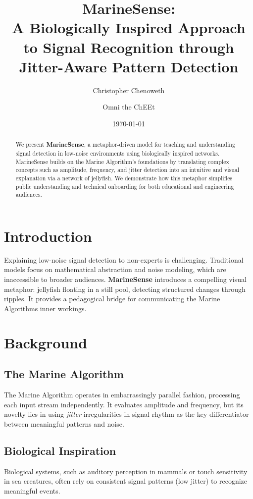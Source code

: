 \documentclass[11pt]{article}
\title{MarineSense:\\A Biologically Inspired Approach to Signal Recognition through Jitter-Aware Pattern Detection}
\author{Christopher Chenoweth \and Omni the ChEEt}
\date{\today}
\begin{document}
\maketitle

\begin{abstract}
We present \textbf{MarineSense}, a metaphor-driven model for teaching and understanding signal detection in low-noise environments using biologically inspired networks. MarineSense builds on the Marine Algorithm's foundations by translating complex concepts such as amplitude, frequency, and jitter detection into an intuitive and visual explanation via a network of jellyfish. We demonstrate how this metaphor simplifies public understanding and technical onboarding for both educational and engineering audiences.
\end{abstract}

\section{Introduction}
Explaining low-noise signal detection to non-experts is challenging. Traditional models focus on mathematical abstraction and noise modeling, which are inaccessible to broader audiences. \textbf{MarineSense} introduces a compelling visual metaphor: jellyfish floating in a still pool, detecting structured changes through ripples. It provides a pedagogical bridge for communicating the Marine Algorithms inner workings.

\section{Background}
\subsection{The Marine Algorithm}
The Marine Algorithm operates in embarrassingly parallel fashion, processing each input stream independently. It evaluates amplitude and frequency, but its novelty lies in using \textit{jitter}  irregularities in signal rhythm  as the key differentiator between meaningful patterns and noise.

\subsection{Biological Inspiration}
Biological systems, such as auditory perception in mammals or touch sensitivity in sea creatures, often rely on consistent signal patterns (low jitter) to recognize meaningful events.
\end{document}
